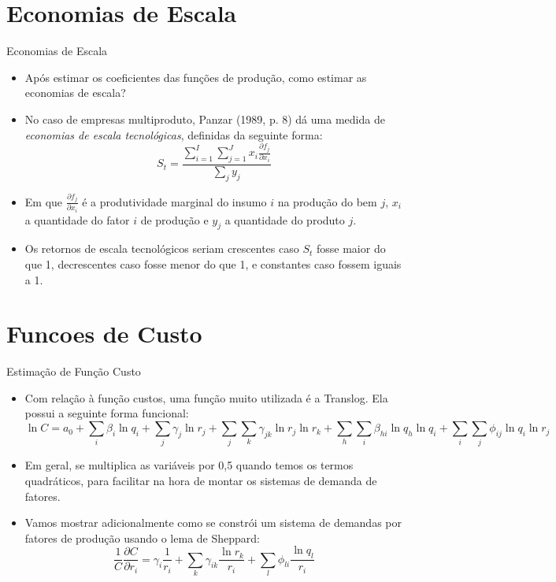 \documentclass{beamer}
\begin{document}
\section{Economias de Escala}
\begin{frame}{Economias de Escala}

\begin{itemize}
\item Após estimar os coeficientes das funções de produção, como estimar
as economias de escala?
\item No caso de empresas multiproduto, Panzar (1989, p. 8) dá uma medida
de \emph{economias de escala tecnológicas}, definidas da seguinte
forma:
\[
S_{t}=\frac{\sum_{i=1}^{I}\sum_{j=1}^{J}x_{i}\frac{\partial f_{j}}{\partial x_{i}}}{\sum_{j}y_{j}}
\]
\item Em que $\frac{\partial f_{j}}{\partial x_{i}}$ é a produtividade
marginal do insumo $i$ na produção do bem $j$, $x_{i}$ a quantidade
do fator $i$ de produção e $y_{j}$ a quantidade do produto $j$. 
\item Os retornos de escala tecnológicos seriam crescentes caso $S_{t}$
fosse maior do que 1, decrescentes caso fosse menor do que 1, e constantes
caso fossem iguais a 1.
\end{itemize}
\end{frame}

\section{Funcoes de Custo}
\begin{frame}{Estimação de Função Custo}

\begin{itemize}
\item Com relação à função custos, uma função muito utilizada é a Translog.
Ela possui a seguinte forma funcional:{\tiny{}
\[
\ln C=a_{0}+\sum_{i}\beta_{i}\ln q_{i}+\sum_{j}\gamma_{j}\ln r_{j}+\sum_{j}\sum_{k}\gamma_{jk}\ln r_{j}\ln r_{k}+\sum_{h}\sum_{i}\beta_{hi}\ln q_{h}\ln q_{i}+\sum_{i}\sum_{j}\phi_{ij}\ln q_{i}\ln r_{j}
\]
}{\tiny \par}
\item Em geral, se multiplica as variáveis por 0,5 quando temos os termos
quadráticos, para facilitar na hora de montar os sistemas de demanda
de fatores. 
\item Vamos mostrar adicionalmente como se constrói um sistema de demandas
por fatores de produção usando o lema de Sheppard:
\[
\frac{1}{C}\frac{\partial C}{\partial r_{i}}=\gamma_{i}\frac{1}{r_{i}}+\sum_{k}\gamma_{ik}\frac{\ln r_{k}}{r_{i}}+\sum_{l}\phi_{li}\frac{\ln q_{l}}{r_{i}}
\]
\end{itemize}
\end{frame}
\end{document}
